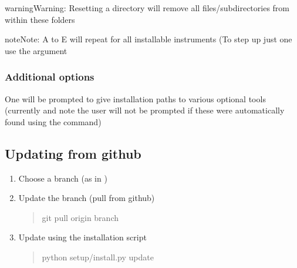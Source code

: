 \documentclass[a4paper,10pt,english]{report}
\begin{document}
\begin{sphinxadmonition}{warning}{Warning:}
Resetting a directory will remove all files/sub\sphinxhyphen{}directories from within these folders
\end{sphinxadmonition}

\begin{sphinxadmonition}{note}{Note:}
A to E will repeat for all installable instruments (To step up just one use the  argument
\end{sphinxadmonition}


\subsubsection{Additional options}
\label{\detokenize{user/general/installation:additional-options}}
One will be prompted to give installation paths to various optional tools (currently {\hyperref[\detokenize{misc/glossary:term-ds9}]{}}
and {\hyperref[\detokenize{misc/glossary:term-pdflatex}]{}}
note the user will not be prompted if these were automatically found using the 
command)


\subsection{Updating from github}
\label{\detokenize{user/general/installation:updating-from-github}}\label{\detokenize{user/general/installation:installation-update}}\begin{enumerate}
%
\item {} 
Choose a branch (as in {\hyperref[\detokenize{user/general/installation:installation-choose-branch}]{}})

\item {} 
Update the branch (pull from github)
\begin{quote}

\begin{sphinxVerbatim}[commandchars=\\\{\}]
git pull origin branch
\end{sphinxVerbatim}
\end{quote}

\item {} 
Update using the installation script
\begin{quote}

\begin{sphinxVerbatim}[commandchars=\\\{\}]
python setup/install.py \PYGZhy{}\PYGZhy{}update
\end{sphinxVerbatim}
\end{quote}

\end{enumerate}
\end{document}
